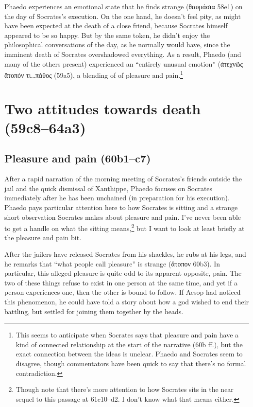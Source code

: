 \documentclass[12pt,letterpaper]{article}
\begin{document}
Phaedo experiences an emotional state that he finds strange (\textgreek{θαυμάσια} 58e1) on the day of Socrates's execution. On the one hand, he doesn't feel pity, as might have been expected at the death of a close friend, because Socrates himself appeared to be so happy. But by the same token, he didn't enjoy the philosophical conversations of the day, as he normally would have, since the imminent death of Socrates overshadowed everything. As a result, Phaedo (and many of the others present) experienced an ``entirely unusual emotion'' (\textgreek{ἀτεχνῶς ἄτοπόν τι\dots πάθος (59a5)}, a blending of of pleasure and pain.\footnote{This seems to anticipate when Socrates says that pleasure and pain have a kind of connected relationship at the start of the narrative (60b ff.), but the exact connection between the ideas is unclear. Phaedo and Socrates seem to disagree, though commentators have been quick to say that there's no formal contradiction.}

\section{Two attitudes towards death (59c8--64a3)}

\subsection{Pleasure and pain (60b1--c7)}

After a rapid narration of the morning meeting of Socrates's friends outside the jail and the quick dismissal of Xanthippe, Phaedo focuses on Socrates immediately after he has been unchained (in preparation for his execution). Phaedo pays particular attention here to how Socrates is sitting and a strange short observation Socrates makes about pleasure and pain. I've never been able to get a handle on what the sitting means,\footnote{Though note that there's more attention to how Socrates sits in the near sequel to this passage at 61c10--d2. I don't know what that means either.} but I want to look at least briefly at the pleasure and pain bit.

After the jailers have released Socrates from his shackles, he rubs at his legs, and he remarks that ``what people call pleasure'' is strange (\textgreek{ἄτοπον} 60b3). In particular, this alleged pleasure is quite odd to its apparent opposite, pain. The two of these things refuse to exist in one person at the same time, and yet if a person experiences one, then the other is bound to follow. If Aesop had noticed this phenomenon, he could have told a story about how a god wished to end their battling, but settled for joining them together by the heads.

\newpage
\printbibliography
\end{document}

